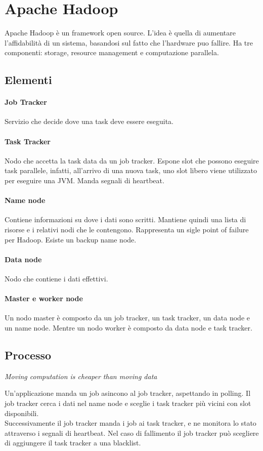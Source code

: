 \section{Apache Hadoop}
Apache Hadoop è un framework open source. L'idea è quella di aumentare l'affidabilità di un sistema, basandosi sul fatto che l'hardware puo fallire.
Ha tre componenti: storage, resource management e computazione parallela.

\subsection{Elementi}

\paragraph{Job Tracker}
Servizio che decide dove una task deve essere eseguita.

\paragraph{Task Tracker}
Nodo che accetta la task data da un job tracker. Espone slot che possono eseguire
task parallele, infatti, all'arrivo di una nuova task, uno slot libero viene utilizzato per eseguire una JVM. Manda segnali di heartbeat.

\paragraph{Name node}
Contiene informazioni su dove i dati sono scritti. Mantiene quindi una lista 
di risorse e i relativi nodi che le contengono. Rappresenta un sigle point of failure
per Hadoop. Esiste un backup name node.

\paragraph{Data node}
Nodo che contiene i dati effettivi.

\paragraph{Master e worker node}
Un nodo master è composto da un job tracker, un task tracker, un data node e un name node. Mentre un nodo worker è composto da data node e task tracker.

\subsection{Processo}
\begin{center}
        \emph{Moving computation is cheaper than moving data}
\end{center}
Un'applicazione manda un job asincono al job tracker, aspettando in polling.
Il job tracker cerca i dati nel name node e sceglie i task tracker più vicini
con slot disponibili.\\
Successivamente il job tracker manda i job ai task tracker, e ne monitora 
lo stato attraverso i segnali di heartbeat. Nel caso di fallimento il job tracker
può scegliere di aggiungere il task tracker a una blacklist.

